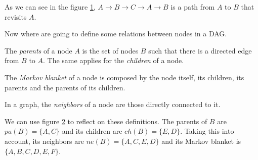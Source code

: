 \begin{figure}[h]
\centering
{}
\label{fig:not_dag}
\end{figure}

As we can see in the figure \ref{fig:not_dag}, \(A \to B \to C \to A \to B\) is a
path from \(A\) to \(B\) that revisits \(A\).

Now where are going to define some relations between nodes in a DAG.

\begin{definition}
The \emph{parents} of a node \(A\) is the set of nodes \(B\) such that there is a
directed edge from \(B\) to \(A\). The same applies for the \emph{children} of a node.

The \emph{Markov blanket} of a node is composed by the node itself, its children, its parents and the parents
of its children.
\end{definition}


\begin{figure}[h]
\centering
{}
\label{fig:relations}
\end{figure}

\begin{definition}
In a graph, the \emph{neighbors} of a node are those directly connected
to it.
\end{definition}

We can use figure \ref{fig:relations} to reflect on these definitions. The parents
of \(B\) are \(pa(B) = \{A,C\}\) and its children are \(ch(B) = \{E,D\}\). Taking this into account, its neighbors
are \(ne(B) = \{A,C,E,D\}\) and its Markov blanket is \(\{A,B,C,D,E,F\}\).

